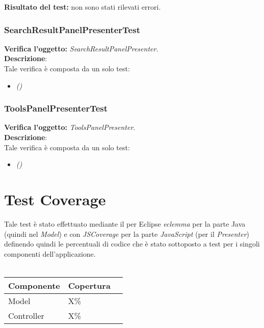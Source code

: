 \begin{itemize}
\end{itemize}
\textbf{Risultato del test:} non sono stati rilevati errori.

\subsubsection{SearchResultPanelPresenterTest}
\textbf{Verifica l'oggetto:} \textit{SearchResultPanelPresenter}.\\
\textbf{Descrizione}:\\
Tale verifica è composta da un solo test:
\begin{itemize}
\item \textit{() } %
\end{itemize}

\subsubsection{ToolsPanelPresenterTest}
\textbf{Verifica l'oggetto:} \textit{ToolsPanelPresenter}.\\
\textbf{Descrizione}:\\
Tale verifica è composta da un solo test:
\begin{itemize}
\item \textit{() } %
\end{itemize}


\section{Test Coverage}
Tale test è stato effettuato mediante il \underline{} per Eclipse \textit{eclemma} per la parte Java (quindi nel \textit{Model}) e con \textit{JSCoverage} per la parte \textit{JavaScript} (per il \textit{Presenter}) definendo quindi le percentuali di codice che è stato sottoposto a test per i singoli componenti dell'applicazione.\\\\

\begin{center}
\begin{longtable}{p{}ll}
\toprule Componente & Copertura\\
\midrule
Model & X\%\\
Controller & X\% \\
\bottomrule
\end{longtable}
\end{center}

